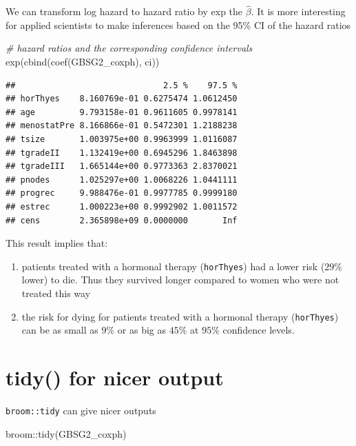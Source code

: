 \documentclass[
]{book}
\makeatletter
\newenvironment{Shaded}{\begin{snugshade}}{\end{snugshade}}
\newcommand{\CommentTok}[1]{\textcolor[rgb]{0.37,0.37,0.37}{\textit{#1}}}
\newcommand{\FunctionTok}[1]{\textcolor[rgb]{0,0,0}{#1}}
\newcommand{\NormalTok}[1]{#1}
\newcommand{\SpecialCharTok}[1]{\textcolor[rgb]{0,0,0}{#1}}
\providecommand{\tightlist}{%
  \setlength{\itemsep}{0pt}\setlength{\parskip}{0pt}}
\newenvironment{kframe}{%
\medskip{}
\setlength{\fboxsep}{.8em}
 \def\at@end@of@kframe{}%
 \ifinner\ifhmode%
  \def\at@end@of@kframe{\end{minipage}}%
  \begin{minipage}{\columnwidth}%
 \fi\fi%
 \def\FrameCommand##1{\hskip\@totalleftmargin \hskip-\fboxsep
 \colorbox{shadecolor}{##1}\hskip-\fboxsep
     \hskip-\linewidth \hskip-\@totalleftmargin \hskip\columnwidth}%
 \MakeFramed {\advance\hsize-\width
   \@totalleftmargin\z@ \linewidth\hsize
   \@setminipage}}%
 {\par\unskip\endMakeFramed%
 \at@end@of@kframe}
\renewenvironment{Shaded}{\begin{kframe}}{\end{kframe}}
\makeatother
\begin{document}
We can transform log hazard to hazard ratio by exp the \(\hat\beta\). It is more interesting for applied scientists to make inferences based on the 95\% CI of the hazard ratios

\begin{Shaded}
\begin{Highlighting}[]
\CommentTok{\# hazard ratios and the corresponding confidence intervals }
\FunctionTok{exp}\NormalTok{(}\FunctionTok{cbind}\NormalTok{(}\FunctionTok{coef}\NormalTok{(GBSG2\_coxph), ci))}
\end{Highlighting}
\end{Shaded}

\begin{verbatim}
##                              2.5 %    97.5 %
## horThyes    8.160769e-01 0.6275474 1.0612450
## age         9.793158e-01 0.9611605 0.9978141
## menostatPre 8.166866e-01 0.5472301 1.2188238
## tsize       1.003975e+00 0.9963999 1.0116087
## tgradeII    1.132419e+00 0.6945296 1.8463898
## tgradeIII   1.665144e+00 0.9773363 2.8370021
## pnodes      1.025297e+00 1.0068226 1.0441111
## progrec     9.988476e-01 0.9977785 0.9999180
## estrec      1.000223e+00 0.9992902 1.0011572
## cens        2.365898e+09 0.0000000       Inf
\end{verbatim}

This result implies that:

\begin{enumerate}
\def\labelenumi{\arabic{enumi}.}
\tightlist
\item
  patients treated with a hormonal therapy (\texttt{horThyes}) had a lower
  risk (\(29\%\) lower) to die. Thus they survived longer compared to women who were not treated this
  way
\item
  the risk for dying for patients treated with a hormonal therapy (\texttt{horThyes}) can be as small as \(9\%\) or as big as \(45\%\) at \(95\%\) confidence levels.
\end{enumerate}

\hypertarget{tidy-for-nicer-output}{%
\section{\texorpdfstring{\textbf{tidy()} for nicer output}{tidy() for nicer output}}\label{tidy-for-nicer-output}}

\texttt{broom::tidy} can give nicer outputs

\begin{Shaded}
\begin{Highlighting}[]
\NormalTok{broom}\SpecialCharTok{::}\FunctionTok{tidy}\NormalTok{(GBSG2\_coxph)}
\end{Highlighting}
\end{Shaded}
\end{document}

